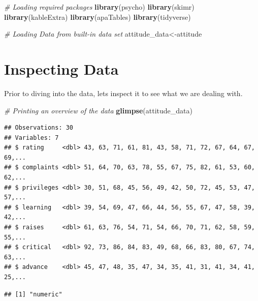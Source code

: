 \documentclass[]{book}
\newenvironment{Shaded}{\begin{snugshade}}{\end{snugshade}}
\newcommand{\CommentTok}[1]{\textcolor[rgb]{0.56,0.35,0.01}{\textit{#1}}}
\newcommand{\KeywordTok}[1]{\textcolor[rgb]{0.13,0.29,0.53}{\textbf{#1}}}
\newcommand{\NormalTok}[1]{#1}
\newcommand{\OperatorTok}[1]{\textcolor[rgb]{0.81,0.36,0.00}{\textbf{#1}}}
\theoremstyle{definition}
\theoremstyle{definition}
\theoremstyle{definition}
\theoremstyle{remark}
\begin{document}
\begin{Shaded}
\begin{Highlighting}[]
\CommentTok{# Loading required packages}
\KeywordTok{library}\NormalTok{(psycho)}
\KeywordTok{library}\NormalTok{(skimr)}
\KeywordTok{library}\NormalTok{(kableExtra)}
\KeywordTok{library}\NormalTok{(apaTables)}
\KeywordTok{library}\NormalTok{(tidyverse)}

\CommentTok{# Loading Data from built-in data set}
\NormalTok{attitude_data<-attitude}
\end{Highlighting}
\end{Shaded}

\hypertarget{inspecting-data}{%
\section{Inspecting Data}\label{inspecting-data}}

Prior to diving into the data, lets inspect it to see what we are dealing with.

\begin{Shaded}
\begin{Highlighting}[]
\CommentTok{# Printing an overview of the data}
\KeywordTok{glimpse}\NormalTok{(attitude_data)}
\end{Highlighting}
\end{Shaded}

\begin{verbatim}
## Observations: 30
## Variables: 7
## $ rating     <dbl> 43, 63, 71, 61, 81, 43, 58, 71, 72, 67, 64, 67, 69,...
## $ complaints <dbl> 51, 64, 70, 63, 78, 55, 67, 75, 82, 61, 53, 60, 62,...
## $ privileges <dbl> 30, 51, 68, 45, 56, 49, 42, 50, 72, 45, 53, 47, 57,...
## $ learning   <dbl> 39, 54, 69, 47, 66, 44, 56, 55, 67, 47, 58, 39, 42,...
## $ raises     <dbl> 61, 63, 76, 54, 71, 54, 66, 70, 71, 62, 58, 59, 55,...
## $ critical   <dbl> 92, 73, 86, 84, 83, 49, 68, 66, 83, 80, 67, 74, 63,...
## $ advance    <dbl> 45, 47, 48, 35, 47, 34, 35, 41, 31, 41, 34, 41, 25,...
\end{verbatim}

\begin{Shaded}
\end{Shaded}

\begin{verbatim}
## [1] "numeric"
\end{verbatim}
\end{document}
